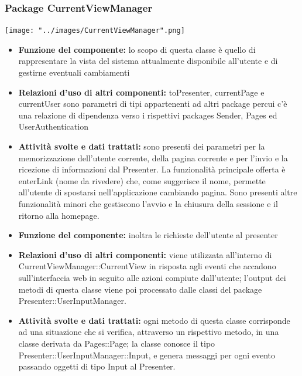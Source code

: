 \documentclass[a4paper,11pt]{article}
\begin{document}
		     \subsubsection{Package CurrentViewManager}
			\begin{center}
				\texttt{[image: "../images/CurrentViewManager".png]}
			\end{center}		    
		    	\begin{itemize}
		    \item\textbf{Funzione del componente:} lo scopo di questa classe è quello di rappresentare la vista del sistema attualmente disponibile all'utente e di gestirne eventuali cambiamenti 
		    \item\textbf{Relazioni d'uso di altri componenti:} toPresenter, currentPage e currentUser sono parametri di tipi appartenenti ad altri package percui c'è una relazione di dipendenza verso i rispettivi packages Sender, Pages ed UserAuthentication
			\item\textbf{Attività svolte e dati trattati:} sono presenti dei parametri per la memorizzazione dell'utente corrente, della pagina corrente e per l'invio e la ricezione di informazioni dal Presenter. La funzionalità principale offerta è enterLink (nome da rivedere) che, come suggerisce il nome, permette all'utente di spostarsi nell'applicazione cambiando pagina. Sono presenti altre funzionalità minori che gestiscono l'avvio e la chiusura della sessione e il ritorno alla homepage.
			\end{itemize}
			\begin{itemize}
			\item\textbf{Funzione del componente:} inoltra le richieste dell'utente al presenter
			\item\textbf{Relazioni d'uso di altri componenti:}  viene utilizzata all'interno di CurrentViewManager::CurrentView in risposta agli eventi che accadono sull'interfaccia web in seguito alle azioni compiute dall'utente; l'output dei metodi di questa classe viene poi processato dalle classi del package Presenter::UserInputManager.
			\item\textbf{Attività svolte e dati trattati:} ogni metodo di questa classe corrisponde ad una situazione che si verifica, attraverso un rispettivo metodo, in una classe derivata da Pages::Page; la classe conosce il tipo Presenter::UserInputManager::Input, e genera messaggi per ogni evento passando oggetti di tipo Input al Presenter.
			\end{itemize}
			
\end{document}
